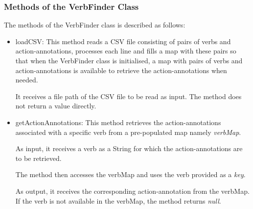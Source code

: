 \subsubsection*{Methods of the VerbFinder Class}
The methods of the VerbFinder class is described as follows:
\begin{itemize}	
	\item loadCSV: This method reads a CSV file consisting of pairs of verbs and action-annotations, processes each line and fills a map with these pairs so that when the VerbFinder class is initialised, a map with pairs of verbs and action-annotations is available to retrieve the action-annotations when needed.
	
	It receives a file path of the CSV file to be read as input. The method does not return a value directly.
	
	\item getActionAnnotations: This method retrieves the action-annotations associated with a specific verb from a pre-populated map namely \textit{verbMap}.
	
	As input, it receives a verb as a String for which the action-annotations are to be retrieved.
	
	The method then accesses the verbMap and uses the verb provided as a \textit{key}.
	
	As output, it receives the corresponding action-annotation from the verbMap. If the verb is not available in the verbMap, the method returns \textit{null}.
	
\end{itemize}
